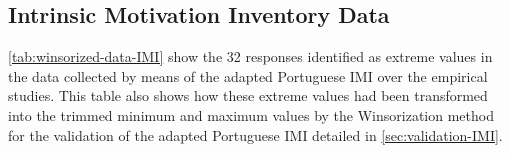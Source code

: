 \subsection{Intrinsic Motivation Inventory Data}

\autoref{tab:winsorized-data-IMI} show the 32 responses identified as extreme values in the data collected by means of the adapted Portuguese IMI over the empirical studies. This table also shows how these extreme values had been transformed into the trimmed minimum and maximum values by the Winsorization method for the validation of the adapted Portuguese IMI detailed in \autoref{sec:validation-IMI}.


